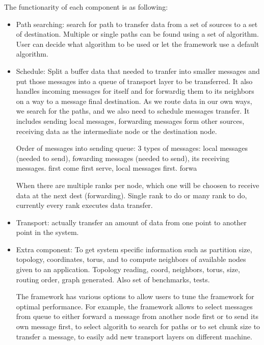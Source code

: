 The functionarity of each component is as following:
\begin{itemize}
\item Path searching: search for path to transfer data from a set of sources to a set of destination. Multiple or single paths can be found using a set of algorithm. User can decide what algorithm to be used or let the framework use a default algorithm.
\item Schedule: Split a buffer data that needed to tranfer into smaller messages and put those messages into a queue of transport layer to be transferred. It also handles incoming messages for itself and for forwardig them to its neighbors on a way to a message final destination.
As we route data in our own ways, we search for the paths, and we also need to schedule messages transfer. It includes sending local messages, forwarding messages form other sources, receiving data as the intermediate node or the destination node.

Order of messages into sending queue: 3 types of messages: local messages (needed to send), fowarding messages (needed to send), its receiving messages. first come first serve, local messages first. forwa

When there are multiple ranks per node, which one will be choosen to receive data at the next dest (forwarding). Single rank to do or many rank to do, currently every rank executes data transfer.

\item Transport: actually transfer an amount of data from one point to another point in the system.
\item Extra component: To get system specific information such as partition size, topology, coordinates, torus, and to compute neighbors of available nodes given to an application. Topology reading, coord, neighbors, torus, size, routing order, graph generated. Also set of benchmarks, tests.

The framework has various options to allow users to tune the framework for optimal performance. For example, the framework allows to select messages from queue to either forward a message from another node first or to send its own message first, to select algorith to search for paths or to set chunk size to transfer a message, to easily add new transport layers on different machine.

\end{itemize}
